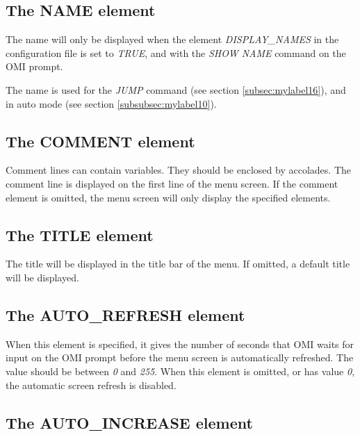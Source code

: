 \documentclass[a4paper]{book}
\newcommand{\vs}{\vspace{3mm}}
\begin{document}
\subsection{The NAME element}
\label{subsubsec:mylabel24}

The name will only be displayed when the element \textsl{DISPLAY{\_}NAMES} in the 
configuration file is set to \textsl{TRUE}, and with the \textsl{SHOW NAME} command on the OMI prompt.

\vs

The name is used for the \textsl{JUMP} command (see section \ref{subsec:mylabel16}),
and in auto mode (see section \ref{subsubsec:mylabel10}).

\subsection{The COMMENT element}
\label{subsubsec:mylabel25}

Comment lines can contain variables. They should be enclosed by accolades. 
The comment line is displayed on the first line of the menu screen. If the 
comment element is omitted, the menu screen will only display the specified 
elements.

\subsection{The TITLE element}
\label{subsubsec:mylabel26}

The title will be displayed in the title bar of the menu. If omitted, a 
default title will be displayed.

\subsection{The AUTO{\_}REFRESH element}
\label{subsubsec:mylabel27}

When this element is specified, it gives the number of seconds that OMI 
waits for input on the OMI prompt before the menu screen is automatically 
refreshed. The value should be between \textsl{0} and \textsl{255}. When this element is 
omitted, or has value \textsl{0}, the automatic screen refresh is disabled.

\subsection{The AUTO{\_}INCREASE element}
\label{subsubsec:mylabel28}
\end{document}
